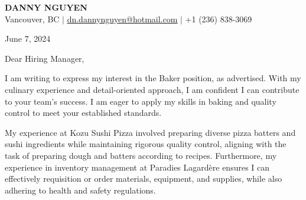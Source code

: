 \documentclass[letterpaper,11pt]{article}
\begin{document}
\begin{center}
\textbf{\Huge \scshape DANNY NGUYEN} \\ \vspace{1pt}
\small Vancouver, BC $|$ \href{mailto:dn.dannynguyen@hotmail.com}{\underline{dn.dannynguyen@hotmail.com}} $|$
+1 (236) 838-3069
\end{center}

\vspace{20pt}
June 7, 2024

\vspace{20pt}

\vspace{10pt}
Dear Hiring Manager,

\vspace{10pt}
I am writing to express my interest in the Baker position, as advertised. With my culinary experience and detail-oriented approach, I am confident I can contribute to your team's success. I am eager to apply my skills in baking and quality control to meet your established standards.

\vspace{10pt}
My experience at Kozu Sushi Pizza involved preparing diverse pizza batters and sushi ingredients while maintaining rigorous quality control, aligning with the task of preparing dough and batters according to recipes. Furthermore, my experience in inventory management at Paradies Lagardère ensures I can effectively requisition or order materials, equipment, and supplies, while also adhering to health and safety regulations.
\end{document}
